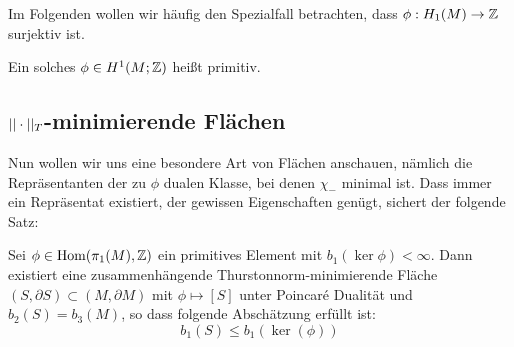 Im Folgenden wollen wir häufig den Spezialfall betrachten, dass $\phi: H_1(M) \to \mathbb{Z}$ surjektiv ist. 
\begin{defn}
	Ein solches $\phi \in H^1(M;\mathbb{Z})$ heißt primitiv.
\end{defn}

\subsection{$||\cdot||_T$-minimierende Flächen}
    
Nun wollen wir uns eine besondere Art von Flächen anschauen, nämlich die Repräsentanten der zu $\phi$ dualen Klasse, bei denen $\chi_-$ minimal ist. Dass immer ein Repräsentat existiert, der gewissen Eigenschaften genügt, sichert der folgende Satz:

\begin{lem}
	\label{lem:minS}
	Sei $\phi \in \operatorname{Hom} (\pi_1(M),\mathbb{Z})$ ein primitives Element mit $b_1(\ker\phi)<\infty$. Dann existiert eine zusammenhängende Thurstonnorm-minimierende Fläche $(S,\partial S) \subset (M,\partial M)$ mit $\phi \mapsto [S]$ unter Poincaré Dualität und $b_2(S)=b_3(M)$, so dass folgende Abschätzung erfüllt ist:
	\[
	b_1(S) \leq b_1(\ker(\phi))
	\]
\end{lem}
